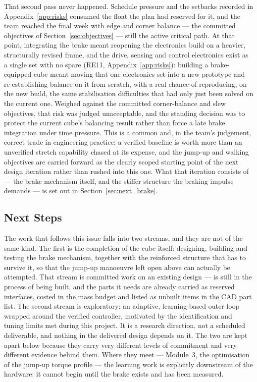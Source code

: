 That second pass never happened. Schedule pressure and the setbacks recorded in Appendix~\ref{app:risks} consumed the float the plan had reserved for it, and the team reached the final week with edge and corner balance --- the committed objectives of Section~\ref{sec:objectives} --- still the active critical path. At that point, integrating the brake meant reopening the electronics build on a heavier, structurally revised frame, and the drive, sensing and control electronics exist as a single set with no spare (RE11, Appendix~\ref{app:risks}): building a brake-equipped cube meant moving that one electronics set into a new prototype and re-establishing balance on it from scratch, with a real chance of reproducing, on the new build, the same stabilisation difficulties that had only just been solved on the current one. Weighed against the committed corner-balance and slew objectives, that risk was judged unacceptable, and the standing decision was to protect the current cube's balancing result rather than force a late brake integration under time pressure. This is a common and, in the team's judgement, correct trade in engineering practice: a verified baseline is worth more than an unverified stretch capability chased at its expense, and the jump-up and walking objectives are carried forward as the clearly scoped starting point of the next design iteration rather than rushed into this one. What that iteration consists of --- the brake mechanism itself, and the stiffer structure the braking impulse demands --- is set out in Section~\ref{sec:next_brake}.


\subsection{Next Steps}
\label{sec:next_steps}

The work that follows this issue falls into two streams, and they are not of the
same kind. The first is the completion of the cube itself: designing, building
and testing the brake mechanism, together with the reinforced structure that has
to survive it, so that the jump-up manoeuvre left open above can actually be
attempted. That stream is committed work on an existing design ---
\projectname{} is still in the process of being built, and the parts it needs
are already carried as reserved interfaces, costed in the mass budget and listed
as unbuilt items in the CAD part list. The second stream is exploratory: an
adaptive, learning-based outer loop wrapped around the verified controller,
motivated by the identification and tuning limits met during this project. It is
a research direction, not a scheduled deliverable, and nothing in the delivered
design depends on it. The two are kept apart below because they carry very
different levels of commitment and very different evidence behind them. Where
they meet --- Module~3, the optimisation of the jump-up torque profile --- the
learning work is explicitly downstream of the hardware: it cannot begin until
the brake exists and has been measured.

